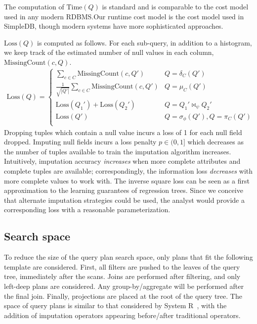 The computation of $\text{Time}(Q)$ is standard and is comparable to the cost model used in
any modern RDBMS.\@ Our runtime cost model is the cost model used in SimpleDB, though modern systems
have more sophisticated approaches.

$\text{Loss}(Q)$ is computed as follows.
For each sub-query, in addition to a histogram, we keep track of the estimated number of
null values in each column, $\text{MissingCount}(c, Q)$.
\begin{align*}
  \text{Loss}(Q) = \begin{cases}
    \sum_{c \in C} \text{MissingCount}(c, Q') & Q = \delta_C(Q') \\
    \frac{1}{\sqrt{|Q'|}} \sum_{c \in C} \text{MissingCount}(c, Q') & Q = \mu_C(Q') \\
    \text{Loss}(Q_1') + \text{Loss}(Q_2') & Q = Q_1' \bowtie_\psi Q_2' \\
    \text{Loss}(Q') & Q = \sigma_\phi(Q'), Q = \pi_C(Q') \\
  \end{cases}
\end{align*}
Dropping tuples which contain a null value incurs a loss of 1 for each null field dropped.
Imputing null fields incurs a loss penalty $p \in (0, 1]$ which decreases as the number of
tuples available to train the imputation algorithm increases.  Intuitively, imputation
accuracy \textit{increases} when more complete attributes and complete tuples are available;
correspondingly, the information loss \textit{decreases} with more complete values to work
with. The inverse square loss can be seen as a first approximation to the learning guarantees of
regression trees.  Since we conceive that
alternate imputation strategies could be used, the analyst would provide a corresponding
loss with a reasonable parameterization.


\subsection{Search space}
\label{sec:search-space}
To reduce the size of the query plan search space, only plans that fit the following template are considered. First, all filters are pushed to the leaves of the query tree, immediately after the scans. Joins are performed after filtering, and only left-deep plans are considered. Any group-by/aggregate will be performed after the final join. Finally, projections are placed at the root of the query tree. The space of query plans is similar to that considered by System R~\cite{blasgen1981system}, with the addition of imputation operators appearing before/after traditional operators.

